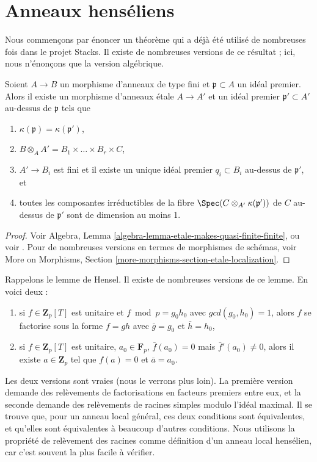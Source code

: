 \section{Anneaux hens\'eliens}
\label{section-henselian-ring}

\noindent
Nous commen\c{c}ons par \'enoncer un th\'eor\`eme qui a d\'ej\`a \'et\'e utilis\'e de nombreuses fois
dans le projet Stacks. Il existe de nombreuses versions de ce r\'esultat ; ici, nous
n'\'enon\c{c}ons que la version alg\'ebrique.

\begin{theorem}
\label{theorem-quasi-finite-etale-locally}
Soient $A\to B$ un morphisme d'anneaux de type fini et $\mathfrak p \subset A$ un
id\'eal premier. Alors il existe un morphisme d'anneaux \'etale $A \to A'$ et un id\'eal premier
$\mathfrak p' \subset A'$ au-dessus de $\mathfrak p$ tels que
\begin{enumerate}
\item
$\kappa(\mathfrak p) = \kappa(\mathfrak p')$,
\item
$ B \otimes_A A' = B_1\times \ldots \times B_r \times C$,
\item
$ A'\to B_i$ est fini et il existe un unique id\'eal premier $q_i\subset B_i$ au-dessus
de $\mathfrak p'$, et
\item toutes les composantes irr\'eductibles de la fibre
$\Spec(C \otimes_{A'} \kappa(\mathfrak p'))$ de $C$ au-dessus de $\mathfrak p'$
sont de dimension au moins 1.
\end{enumerate}
\end{theorem}

\begin{proof}
Voir Algebra, Lemma \ref{algebra-lemma-etale-makes-quasi-finite-finite}, ou
voir \cite[Th\'eor\`eme 18.12.1]{EGA4}. Pour de nombreuses versions en termes de
morphismes de sch\'emas, voir
More on Morphisms, Section \ref{more-morphisms-section-etale-localization}.
\end{proof}

\noindent
Rappelons le lemme de Hensel.
Il existe de nombreuses versions de ce lemme. En voici deux :
\begin{enumerate}
\item[(f)] si $f\in \mathbf{Z}_p[T]$ est unitaire et
$f \bmod p = g_0 h_0$ avec $gcd(g_0, h_0) = 1$, alors $f$ se factorise
sous la forme $f = gh$ avec $\bar g = g_0$ et $\bar h = h_0$,
\item[(r)] si $f \in \mathbf{Z}_p[T]$ est unitaire, $a_0 \in \mathbf{F}_p$,
$\bar f(a_0) =0$ mais $\bar f'(a_0) \neq 0$,
alors il existe $a \in \mathbf{Z}_p$ tel que
$f(a) = 0$ et $\bar a = a_0$.
\end{enumerate}
Les deux versions sont vraies (nous le verrons plus loin). La premi\`ere version
demande des rel\`evements de factorisations en facteurs premiers entre eux,
et la seconde demande des rel\`evements de racines simples
modulo l'id\'eal maximal. Il se trouve que, pour un anneau local g\'en\'eral,
ces deux conditions sont \'equivalentes, et qu'elles sont
\'equivalentes \`a beaucoup d'autres conditions. Nous utilisons la propri\'et\'e de rel\`evement
des racines comme d\'efinition d'un anneau local hens\'elien, car c'est
souvent la plus facile \`a v\'erifier.

